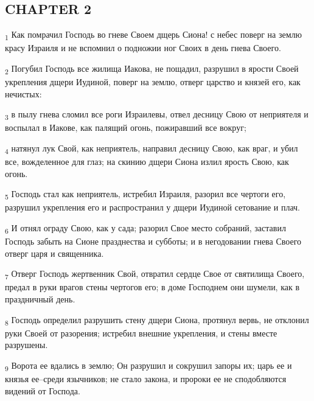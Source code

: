 \subsection{CHAPTER 2}
\begin{tcolorbox}
\textsubscript{1} Как помрачил Господь во гневе Своем дщерь Сиона! с небес поверг на землю красу Израиля и не вспомнил о подножии ног Своих в день гнева Своего.
\end{tcolorbox}
\begin{tcolorbox}
\textsubscript{2} Погубил Господь все жилища Иакова, не пощадил, разрушил в ярости Своей укрепления дщери Иудиной, поверг на землю, отверг царство и князей его, как нечистых:
\end{tcolorbox}
\begin{tcolorbox}
\textsubscript{3} в пылу гнева сломил все роги Израилевы, отвел десницу Свою от неприятеля и воспылал в Иакове, как палящий огонь, пожиравший все вокруг;
\end{tcolorbox}
\begin{tcolorbox}
\textsubscript{4} натянул лук Свой, как неприятель, направил десницу Свою, как враг, и убил все, вожделенное для глаз; на скинию дщери Сиона излил ярость Свою, как огонь.
\end{tcolorbox}
\begin{tcolorbox}
\textsubscript{5} Господь стал как неприятель, истребил Израиля, разорил все чертоги его, разрушил укрепления его и распространил у дщери Иудиной сетование и плач.
\end{tcolorbox}
\begin{tcolorbox}
\textsubscript{6} И отнял ограду Свою, как у сада; разорил Свое место собраний, заставил Господь забыть на Сионе празднества и субботы; и в негодовании гнева Своего отверг царя и священника.
\end{tcolorbox}
\begin{tcolorbox}
\textsubscript{7} Отверг Господь жертвенник Свой, отвратил сердце Свое от святилища Своего, предал в руки врагов стены чертогов его; в доме Господнем они шумели, как в праздничный день.
\end{tcolorbox}
\begin{tcolorbox}
\textsubscript{8} Господь определил разрушить стену дщери Сиона, протянул вервь, не отклонил руки Своей от разорения; истребил внешние укрепления, и стены вместе разрушены.
\end{tcolorbox}
\begin{tcolorbox}
\textsubscript{9} Ворота ее вдались в землю; Он разрушил и сокрушил запоры их; царь ее и князья ее--среди язычников; не стало закона, и пророки ее не сподобляются видений от Господа.
\end{tcolorbox}
